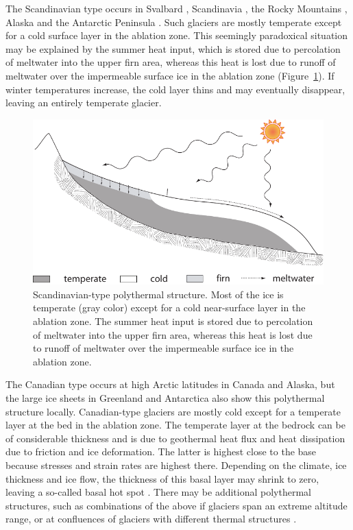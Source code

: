\documentclass[parskip=half]{scrartcl}
\begin{document}
The Scandinavian type occurs in Svalbard \citep{Bamber1988,Jania1996},
Scandinavia \citep{HolmlundEriksson1989}, the Rocky Mountains
\citep{Paterson1971}, Alaska and the Antarctic Peninsula
\citep{Breuer2006}. Such glaciers are mostly temperate except for a
cold surface layer in the ablation zone. This seemingly paradoxical
situation may be explained by the summer heat input, which is stored
due to percolation of meltwater into the upper firn area, whereas this
heat is lost due to runoff of meltwater over the impermeable surface
ice in the ablation zone (Figure~\ref{fig:scandinavian-structure}). If
winter temperatures increase, the cold layer thins and may eventually
disappear, leaving an entirely temperate glacier.

 \begin{figure} \centering
   \includegraphics[width=12cm]{figures/CTS_scandic}
   \caption{Scandinavian-type polythermal structure. Most of the ice
is temperate (gray color) except for a cold near-surface layer in the
ablation zone. The summer heat input is stored due to percolation of
meltwater into the upper firn area, whereas this heat is lost due to
runoff of meltwater over the impermeable surface ice in the ablation
zone.}
   \label{fig:scandinavian-structure}
 \end{figure}

%
The Canadian type occurs at high Arctic latitudes in Canada
\citep{Blatter1987,Blatter1988} and Alaska, but the large ice sheets
in Greenland and Antarctica also show this polythermal structure
locally. Canadian-type glaciers are mostly cold except for a temperate
layer at the bed in the ablation zone. The temperate layer at the
bedrock can be of considerable thickness and is due to geothermal heat
flux and heat dissipation due to friction and ice deformation.  The
latter is highest close to the base because stresses and strain rates
are highest there.  Depending on the climate, ice thickness and ice
flow, the thickness of this basal layer may shrink to zero, leaving a
so-called basal hot spot \citep{Classen1971}. There may be additional
polythermal structures, such as combinations of the above if glaciers
span an extreme altitude range, or at confluences of glaciers with
different thermal structures \citep{Eisen2009}.
\end{document}
